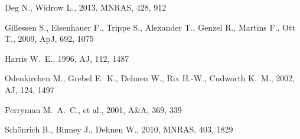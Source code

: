 Deg N., Widrow L., 2013, MNRAS, 428, 912 

Gillessen S., Eisenhauer F., Trippe S., Alexander T., Genzel R., Martins F., Ott T., 2009, ApJ, 692, 1075 

Harris W.~E., 1996, AJ, 112, 1487 

Odenkirchen M., Grebel E.~K., Dehnen W., Rix H.-W., Cudworth K.~M., 2002, AJ, 124, 1497 

Perryman M.~A.~C., et al., 2001, A\&A, 369, 339 

Sch{\"o}nrich R., Binney J., Dehnen W., 2010, MNRAS, 403, 1829 

